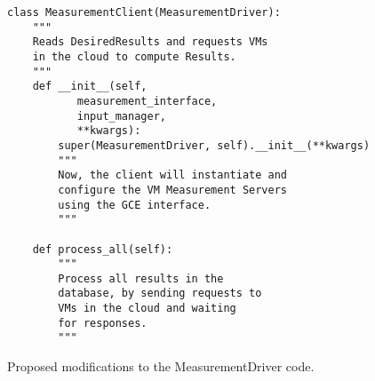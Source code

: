 \begin{listing}[htpb]
    \begin{verbatim}
class MeasurementClient(MeasurementDriver):
    """
    Reads DesiredResults and requests VMs
    in the cloud to compute Results.
    """
    def __init__(self,
           measurement_interface,
           input_manager,
           **kwargs):
        super(MeasurementDriver, self).__init__(**kwargs)
        """
        Now, the client will instantiate and 
        configure the VM Measurement Servers
        using the GCE interface.
        """

    def process_all(self):
        """
        Process all results in the
        database, by sending requests to
        VMs in the cloud and waiting
        for responses.
        """
    \end{verbatim}
    \caption{Proposed modifications to the MeasurementDriver code.}
    \label{fig:measurement-client}
\end{listing}
